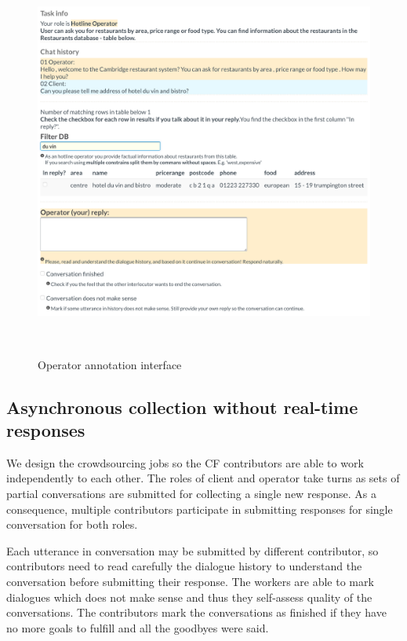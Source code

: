 \documentclass[runningheads,a4paper]{llncs}
\begin{document}
\begin{figure}
\vspace{-1.00em}
\begin{center}
\includegraphics[height=35em]{gui-annotators-system}
\caption{Operator annotation interface}
\end{center}
\vspace{-1.00em}
\label{fig:operator}
\end{figure}
\vspace{-1.00em}

\vspace{-1.00em}
\subsection{Asynchronous collection without real-time responses}
\label{sec:async}
We design the crowdsourcing jobs so the CF contributors are able to work independently to each other.
The roles of client and operator take turns as sets of partial conversations are submitted for collecting a single new response.
As a consequence, multiple contributors participate in submitting responses for single conversation for both roles.

Each utterance in conversation may be submitted by different contributor, so contributors need to read carefully the dialogue history to understand the conversation before submitting their response.
The workers are able to mark dialogues which does not make sense and thus they self-assess quality of the conversations.
The contributors mark the conversations as finished if they have no more goals to fulfill and all the goodbyes were said.
\end{document}
